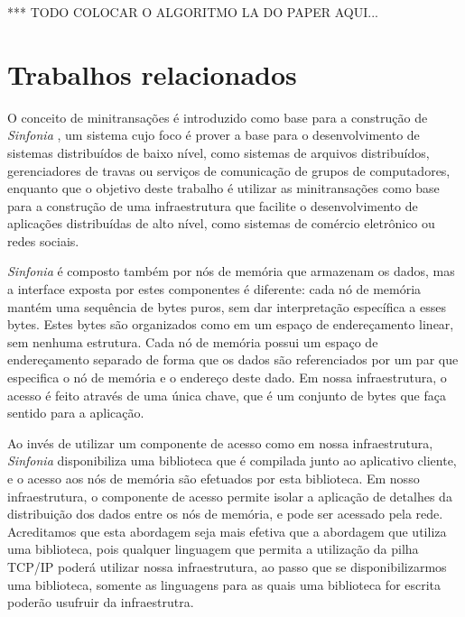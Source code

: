 \documentclass[11pt,twoside,a4paper]{book}
\begin{document}
*** TODO COLOCAR O ALGORITMO LA DO PAPER AQUI...

\section{Trabalhos relacionados}
\label{sec:trabalhos_relacionados}
O conceito de minitransações é introduzido como base para a construção de \emph{Sinfonia} \cite{sinfonia}, um sistema cujo foco é prover a base para o desenvolvimento de sistemas distribuídos de baixo nível, como sistemas de arquivos distribuídos, gerenciadores de travas ou serviços de comunicação de grupos de computadores, enquanto que o objetivo deste trabalho é utilizar as minitransações como base para a construção de uma infraestrutura que facilite o desenvolvimento de aplicações distribuídas de alto nível, como sistemas de comércio eletrônico ou redes sociais. 

\emph{Sinfonia} é composto também por nós de memória que armazenam os dados, mas a interface exposta por estes componentes é diferente: cada nó de memória mantém uma sequência de bytes puros, sem dar interpretação específica a esses bytes. Estes bytes são organizados como em um espaço de endereçamento linear, sem nenhuma estrutura. Cada nó de memória possui um espaço de endereçamento separado de forma que os dados são referenciados por um par que especifica o nó de memória e o endereço deste dado. Em nossa infraestrutura, o acesso é feito através de uma única chave, que é um conjunto de bytes que faça sentido para a aplicação.

Ao invés de utilizar um componente de acesso como em nossa infraestrutura, \emph{Sinfonia} disponibiliza uma biblioteca que é compilada junto ao aplicativo cliente, e o acesso aos nós de memória são efetuados por esta biblioteca. Em nosso infraestrutura, o componente de acesso permite isolar a aplicação de detalhes da distribuição dos dados entre os nós de memória, e pode ser acessado pela rede. Acreditamos que esta abordagem seja mais efetiva que a abordagem que utiliza uma biblioteca, pois qualquer linguagem que permita a utilização da pilha TCP/IP poderá utilizar nossa infraestrutura, ao passo que se disponibilizarmos uma biblioteca, somente as linguagens para as quais uma biblioteca for escrita poderão usufruir da infraestrutra.
\end{document}
